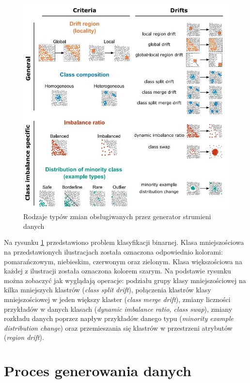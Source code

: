 \begin{figure}[h] 
    \centering
    \includegraphics[width=15cm]{figures/drift_criteria.JPG}
    \caption{Rodzaje typów zmian obsługiwanych przez generator strumieni danych \cite{Article:TypyPrzykladow}}\label{Figure:DriftCriteria}
\end{figure}

\noindent Na rysunku \ref{Figure:DriftCriteria} przedstawiono problem klasyfikacji binarnej. Klasa mniejszościowa na przedstawionych ilustracjach została oznaczona odpowiednio kolorami: pomarańczowym, niebieskim, czerwonym oraz zielonym. Klasa większościowa na każdej z ilustracji została oznaczona kolorem szarym. Na podstawie rysunku można zobaczyć jak wyglądają operacje: podziału grupy klasy mniejszościowej na kilka mniejszych klastrów (\textit{class split drift}), połączenia klastrów klasy mniejszościowej w jeden większy klaster (\textit{class merge drift}), zmiany liczności przykładów w danych klasach (\textit{dynamic imbalance ratio, class swap}), zmiany rozkładu danych poprzez napływ przykładów danego typu (\textit{minority example distribution change}) oraz przemieszania się klastrów w przestrzeni atrybutów (\textit{region drift}). 

\section{Proces generowania danych}


